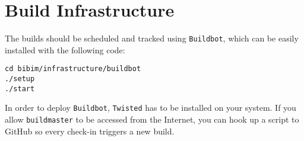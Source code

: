 \documentclass[a4paper,oneside]{article}
\begin{document}
\section{Build Infrastructure}
The builds should be scheduled and tracked using \texttt{Buildbot}, which can be easily installed with the following code:
    \begin{lstlisting}
cd bibim/infrastructure/buildbot
./setup
./start
    \end{lstlisting}
In order to deploy \texttt{Buildbot}, \texttt{Twisted} has to be installed on your system. If you allow \texttt{buildmaster} to be accessed from the Internet, you can hook up a script to GitHub so every check-in triggers a new build.
\end{document}
